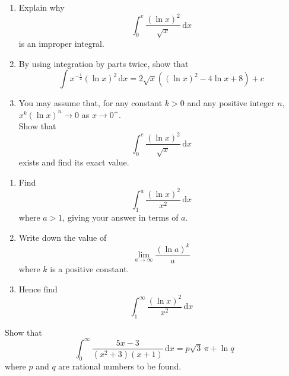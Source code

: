 \documentclass[leqno]{article}
\begin{document}
\begin{enumerate}[
  label=\textbf{\arabic*.},
  leftmargin=*,
  topsep=0pt,
  partopsep=0pt,
  parsep=0pt
]
\newpage

\questionitem

\begin{enumerate}[label=\textbf{(\alph*)}]
  \item Explain why
  \[\int_0^{e} \dfrac{(\ln x)^2}{\sqrt{x}}\,\mathrm{d}x\]
  is an improper integral.  \\
  \item By using integration by parts twice, show that
  \[\int x^{-\frac{1}{2}} (\ln x)^2\,\mathrm{d}x = 2\sqrt{x}\left((\ln x)^2 - 4\ln x + 8\right) + c\] 
  \item You may assume that, for any constant $k > 0$ and any positive integer $n$, $x^k(\ln x)^n \to 0$ as $x \to 0^{+}$. \\

  Show that
  \[\int_0^{e} \dfrac{(\ln x)^2}{\sqrt{x}}\,\mathrm{d}x\]
  exists and find its exact value.  \\
\end{enumerate}

\newpage

\questionitem

\begin{enumerate}[label=\textbf{(\alph*)}]
  \item Find
  \[\int_1^a \dfrac{(\ln x)^2}{x^2}\,\mathrm{d}x\]
  where $a > 1$, giving your answer in terms of $a$.  \\
  \item Write down the value of
  \[\lim_{a \to \infty} \dfrac{(\ln a)^k}{a}\]
  where $k$ is a positive constant.  \\
  \item Hence find
  \[\int_1^{\infty} \dfrac{(\ln x)^2}{x^2}\,\mathrm{d}x\] 
\end{enumerate}

\newpage

\questionitem

Show that
\[\int_0^{\infty} \dfrac{5x-3}{(x^2+3)(x+1)}\,\mathrm{d}x = p\sqrt{3}\,\pi + \ln q\]
where $p$ and $q$ are rational numbers to be found.  \\

\newpage

\questionitem


\end{enumerate}
\end{document}

